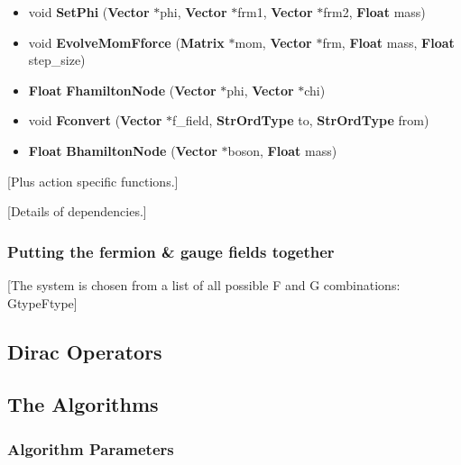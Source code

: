 \documentclass[12pt]{article}
\begin{document}
\begin{itemize}
\item 
void {\bf Set\-Phi} ({\bf Vector} $\ast$phi, {\bf Vector} $\ast$frm1, {\bf Vector} $\ast$frm2, {\bf Float} mass)

\item 
void {\bf Evolve\-Mom\-Fforce} ({\bf Matrix} $\ast$mom, {\bf Vector} $\ast$frm, {\bf Float} mass, {\bf Float} step\_\-size)

\item 
{\bf Float} {\bf Fhamilton\-Node} ({\bf Vector} $\ast$phi, {\bf Vector} $\ast$chi)

\item 
void {\bf Fconvert} ({\bf Vector} $\ast$f\_\-field, {\bf Str\-Ord\-Type} to, {\bf Str\-Ord\-Type} from)

\item 
{\bf Float} {\bf Bhamilton\-Node} ({\bf Vector} $\ast$boson, {\bf Float} mass)
\end{itemize}

[Plus action specific functions.]

[Details of dependencies.]

\subsubsection{Putting the fermion \& gauge fields together}
[The system is chosen from a list of all possible F and G
combinations: GtypeFtype]

\subsection{Dirac Operators}

\subsection{The Algorithms}
\label{col:algclass}

\subsubsection{Algorithm Parameters}
\label{col:algparam}
\end{document}
